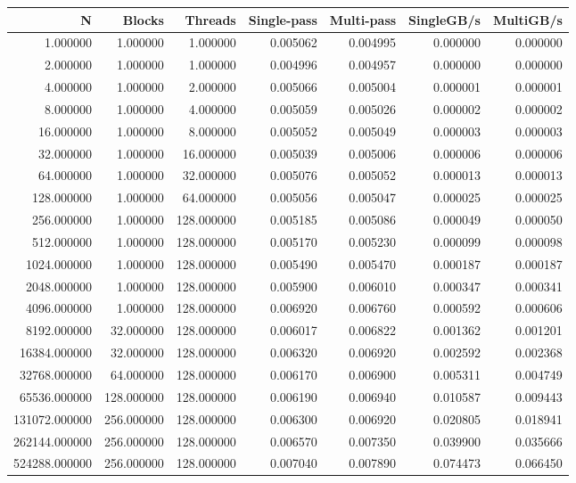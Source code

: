 \begin{tabular}{rrrrrrr}
\toprule
N & Blocks & Threads & Single-pass & Multi-pass & SingleGB/s & MultiGB/s \\
\midrule
1.000000 & 1.000000 & 1.000000 & 0.005062 & 0.004995 & 0.000000 & 0.000000 \\
2.000000 & 1.000000 & 1.000000 & 0.004996 & 0.004957 & 0.000000 & 0.000000 \\
4.000000 & 1.000000 & 2.000000 & 0.005066 & 0.005004 & 0.000001 & 0.000001 \\
8.000000 & 1.000000 & 4.000000 & 0.005059 & 0.005026 & 0.000002 & 0.000002 \\
16.000000 & 1.000000 & 8.000000 & 0.005052 & 0.005049 & 0.000003 & 0.000003 \\
32.000000 & 1.000000 & 16.000000 & 0.005039 & 0.005006 & 0.000006 & 0.000006 \\
64.000000 & 1.000000 & 32.000000 & 0.005076 & 0.005052 & 0.000013 & 0.000013 \\
128.000000 & 1.000000 & 64.000000 & 0.005056 & 0.005047 & 0.000025 & 0.000025 \\
256.000000 & 1.000000 & 128.000000 & 0.005185 & 0.005086 & 0.000049 & 0.000050 \\
512.000000 & 1.000000 & 128.000000 & 0.005170 & 0.005230 & 0.000099 & 0.000098 \\
1024.000000 & 1.000000 & 128.000000 & 0.005490 & 0.005470 & 0.000187 & 0.000187 \\
2048.000000 & 1.000000 & 128.000000 & 0.005900 & 0.006010 & 0.000347 & 0.000341 \\
4096.000000 & 1.000000 & 128.000000 & 0.006920 & 0.006760 & 0.000592 & 0.000606 \\
8192.000000 & 32.000000 & 128.000000 & 0.006017 & 0.006822 & 0.001362 & 0.001201 \\
16384.000000 & 32.000000 & 128.000000 & 0.006320 & 0.006920 & 0.002592 & 0.002368 \\
32768.000000 & 64.000000 & 128.000000 & 0.006170 & 0.006900 & 0.005311 & 0.004749 \\
65536.000000 & 128.000000 & 128.000000 & 0.006190 & 0.006940 & 0.010587 & 0.009443 \\
131072.000000 & 256.000000 & 128.000000 & 0.006300 & 0.006920 & 0.020805 & 0.018941 \\
262144.000000 & 256.000000 & 128.000000 & 0.006570 & 0.007350 & 0.039900 & 0.035666 \\
524288.000000 & 256.000000 & 128.000000 & 0.007040 & 0.007890 & 0.074473 & 0.066450 \\

\end{tabular}

